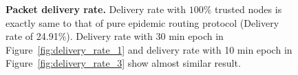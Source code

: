 \documentclass[11pt]{article}
\begin{document}
\begin{figure}[h!]
\center
{}
\hfill
{}
\caption{{\bf Packet delivery rate.} 
Delivery rate with $100\%$ trusted nodes is exactly same to that of pure epidemic routing protocol (Delivery rate of 24.91\%). 
Delivery rate with 30 min epoch in Figure~\ref{fig:delivery_rate_1} and delivery rate with 10 min epoch in Figure~\ref{fig:delivery_rate_3} show almost similar result. 
}
\label{fig:delivery_rate}
\end{figure}
\end{document}
